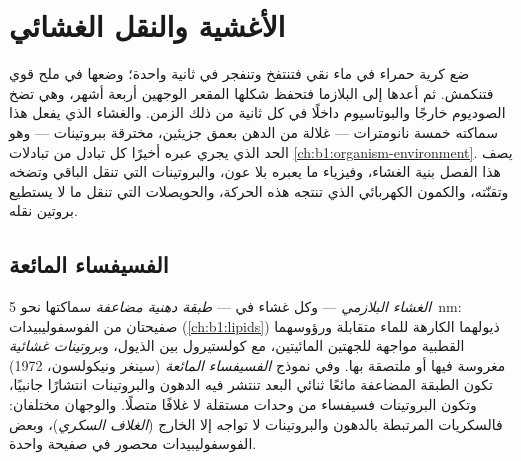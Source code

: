 \chapter{الأغشية والنقل الغشائي}\label{ch:b1:membranes-transport}

ضع كرية حمراء في ماء نقي فتنتفخ وتنفجر في ثانية واحدة؛ وضعها في ملح
قوي فتنكمش. ثم أعدها إلى البلازما فتحفظ شكلها المقعر الوجهين أربعة
أشهر، وهي تضخ الصوديوم خارجًا والبوتاسيوم داخلًا في كل ثانية من ذلك
الزمن. والغشاء الذي يفعل هذا سماكته خمسة نانومترات --- غلالة من
الدهن بعمق جزيئين، مخترقة ببروتينات --- وهو الحد الذي يجري عبره
أخيرًا كل تبادل من تبادلات \cref{ch:b1:organism-environment}. يصف هذا
الفصل بنية الغشاء، وفيزياء ما يعبره بلا عون، والبروتينات التي تنقل
الباقي وتضخه وتقنّته، والكمون الكهربائي الذي تنتجه هذه الحركة،
والحويصلات التي تنقل ما لا يستطيع بروتين نقله.

\section{الفسيفساء المائعة}

\begin{definition}\label{def:b1:membranes-transport:membrane}
\emph{الغشاء البلازمي} --- وكل غشاء في  ---
\emph{طبقة دهنية مضاعفة} سماكتها نحو
\qty{5}{nm}: صفيحتان من الفوسفوليبيدات (\cref{ch:b1:lipids}) ذيولهما
الكارهة للماء متقابلة ورؤوسهما القطبية مواجهة للجهتين المائيتين، مع
كولستيرول بين الذيول، و\emph{بروتينات غشائية}
مغروسة فيها أو ملتصقة بها. وفي نموذج \emph{الفسيفساء
المائعة} (سينغر ونيكولسون، 1972) تكون
الطبقة المضاعفة مائعًا ثنائي البعد تنتشر فيه الدهون والبروتينات
انتشارًا جانبيًا، وتكون البروتينات فسيفساء من وحدات مستقلة لا غلافًا
متصلًا. والوجهان مختلفان: فالسكريات المرتبطة بالدهون والبروتينات لا
تواجه إلا الخارج (\emph{الغلاف السكري})، وبعض الفوسفوليبيدات محصور في
صفيحة واحدة.
\end{definition}

